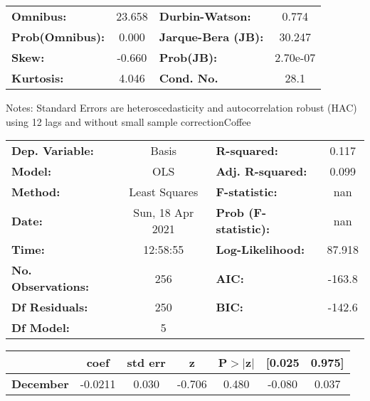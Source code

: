 \begin{center}
\begin{tabular}{lcccccc}
\bottomrule
\end{tabular}
\begin{tabular}{lclc}
\textbf{Omnibus:}       & 23.658 & \textbf{  Durbin-Watson:     } &    0.774  \\
\textbf{Prob(Omnibus):} &  0.000 & \textbf{  Jarque-Bera (JB):  } &   30.247  \\
\textbf{Skew:}          & -0.660 & \textbf{  Prob(JB):          } & 2.70e-07  \\
\textbf{Kurtosis:}      &  4.046 & \textbf{  Cond. No.          } &     28.1  \\
\bottomrule
\end{tabular}
\end{center}

Notes: \newline
 [1] Standard Errors are heteroscedasticity and autocorrelation robust (HAC) using 12 lags and without small sample correctionCoffee\begin{center}
\begin{tabular}{lclc}
\toprule
\textbf{Dep. Variable:}    &      Basis       & \textbf{  R-squared:         } &     0.117   \\
\textbf{Model:}            &       OLS        & \textbf{  Adj. R-squared:    } &     0.099   \\
\textbf{Method:}           &  Least Squares   & \textbf{  F-statistic:       } &       nan   \\
\textbf{Date:}             & Sun, 18 Apr 2021 & \textbf{  Prob (F-statistic):} &      nan    \\
\textbf{Time:}             &     12:58:55     & \textbf{  Log-Likelihood:    } &    87.918   \\
\textbf{No. Observations:} &         256      & \textbf{  AIC:               } &    -163.8   \\
\textbf{Df Residuals:}     &         250      & \textbf{  BIC:               } &    -142.6   \\
\textbf{Df Model:}         &           5      & \textbf{                     } &             \\
\bottomrule
\end{tabular}
\begin{tabular}{lcccccc}
                  & \textbf{coef} & \textbf{std err} & \textbf{z} & \textbf{P$> |$z$|$} & \textbf{[0.025} & \textbf{0.975]}  \\
\midrule
\textbf{December} &      -0.0211  &        0.030     &    -0.706  &         0.480        &       -0.080    &        0.037     \\

\end{tabular}
\end{center}
